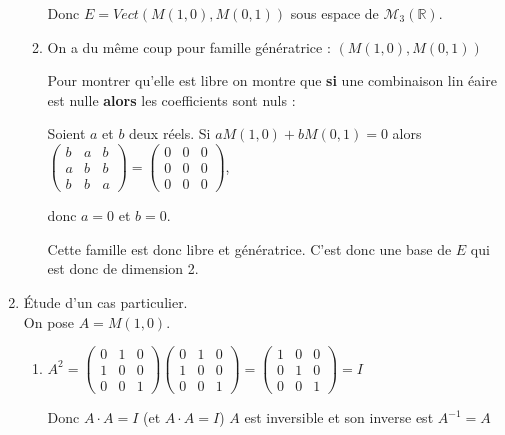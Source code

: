 \begin{correction}
\begin{enumerate}
\begin{enumerate}
Donc $E=Vect\left( M\left( 1,0\right) ,M\left( 0,1\right) \right) $ sous
espace de $\mathcal{M}_{3}(\mathbb{R})$.

\item On a du m\^{e}me coup pour famille g\'{e}n\'{e}ratrice : $\left(
M\left( 1,0\right) ,M\left( 0,1\right) \right) $

Pour montrer qu'elle est libre on montre que \textbf{si} une combinaison lin%
\'{e}aire est nulle \textbf{alors }les coefficients sont nuls :

Soient $a$ et $b$ deux r\'{e}els. Si $aM\left( 1,0\right) +bM\left(
0,1\right) =0$ alors $\left( 
\begin{array}{rrr}
b & a & b \\ 
a & b & b \\ 
b & b & a%
\end{array}
\right) =\left( 
\begin{array}{rrr}
0 & 0 & 0 \\ 
0 & 0 & 0 \\ 
0 & 0 & 0%
\end{array}
\right) $,

donc $a=0$ et $b=0.$

Cette famille est donc libre et g\'{e}n\'{e}ratrice. C'est donc une base de $%
E$ qui est donc de dimension 2.
\end{enumerate}

\item \'Etude d'un cas particulier.\\

On pose $A=M(1,0)$.

\begin{enumerate}
\item $A^{2}=\left( 
\begin{array}{rrr}
0 & 1 & 0 \\ 
1 & 0 & 0 \\ 
0 & 0 & 1%
\end{array}
\right) \left( 
\begin{array}{rrr}
0 & 1 & 0 \\ 
1 & 0 & 0 \\ 
0 & 0 & 1%
\end{array}
\right) =\allowbreak \left( 
\begin{array}{ccc}
1 & 0 & 0 \\ 
0 & 1 & 0 \\ 
0 & 0 & 1%
\end{array}
\right) =I$

Donc $A\cdot A=I$ (et $A\cdot A=I$) $A$ est inversible et son inverse est $%
A^{-1}=A$


\end{enumerate}
\end{enumerate}
\end{correction}
